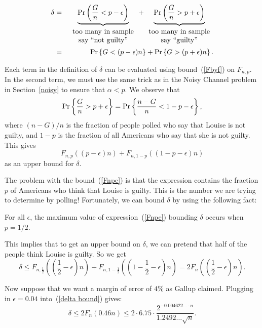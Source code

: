 \documentclass[11pt,twoside]{article}
\begin{document}
\begin{eqnarray*}
\delta  & = &
        \underbrace{\Pr\left(\frac{G}{n} < p - \epsilon\right)}_{
\begin{array}{c}
\mbox{too many in sample} \\
\mbox{say ``not guilty''}
\end{array}}
        + \underbrace{\Pr\left(\frac{G}{n} > p + \epsilon\right)}_{
\begin{array}{c}
\mbox{too many in sample} \\
\mbox{say ``guilty''}
\end{array}} \\
        & = & \mathop{\textup{Pr}}\nolimits\left\{G < (p - \epsilon) n\right\} + \mathop{\textup{Pr}}\nolimits\left\{G > (p + \epsilon) n\right\}.
\end{eqnarray*}

Each term in the definition of $\delta$ can be evaluated using
bound~(\ref{Fbyf}) on $F_{n,p}$.  In the second term, we must use the same
trick as in the Noisy Channel problem in Section~\ref{noisy} to
ensure that $\alpha < p$.  We observe that
\[
\mathop{\textup{Pr}}\nolimits\left\{\frac{G}{n} > p + \epsilon\right\} = \mathop{\textup{Pr}}\nolimits\left\{\frac{n - G}{n} < 1 -p - \epsilon\right\},
\]
where $(n - G)/n$ is the fraction of people polled who say that
Louise is not guilty, and $1-p$ is the fraction of all Americans who say
that she is not guilty.  This gives
\begin{equation}\label{Fnpe}
F_{n,p}((p - \epsilon) n) + F_{n,1-p}((1-p-\epsilon) n)
\end{equation}
as an upper bound for $\delta$.

The problem with the bound~(\ref{Fnpe}) is that the expression
contains the fraction $p$ of Americans who think that Louise is
guilty.  This is the number we are trying to determine by polling!
Fortunately, we can bound $\delta$ by using the following fact:
\begin{fact}
For all $\epsilon$, the maximum value of expression~(\ref{Fnpe}) bounding
$\delta$ occurs when $p = 1/2$.
\end{fact}

This implies that to get an upper bound on $\delta$, we can pretend that
half of the people think Louise is guilty.  So we get
\begin{equation}\label{delta bound}
\delta \leq F_{n,\frac{1}{2}}((\frac{1}{2} - \epsilon) n) +
   F_{n,1-\frac{1}{2}}((1-\frac{1}{2}-\epsilon) n)
 = 2 F_{n}((\frac{1}{2} - \epsilon) n).
\end{equation}

Now suppose that we want a margin of error of $4\%$ as Gallup claimed.
Plugging in $\epsilon = 0.04$ into~(\ref{delta bound}) gives:
\begin{equation*}
\delta \leq   2 F_{n}(0.46 n)
 \leq 
2 \cdot 6.75 \cdot \frac{2^{-0.004622\ldots \cdot n}}{1.2492\ldots \sqrt{n}}.
\end{equation*}
\end{document}
